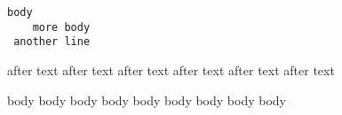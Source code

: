 \begin{verbatim}
body
    more body
 another line
    \end{verbatim}

after text after text 
after text after text 
after text after text 
\begin{not}
	body body body
	body body body
	body body body
\end{not}
